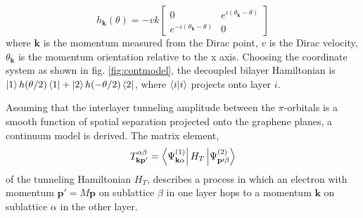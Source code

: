 \begin{equation}
	h_{\mathbf{k}}(\theta)=-vk \begin{bmatrix}
		0 & e^{i(\theta_{\mathbf{k}}-\theta)}\\
		e^{-i(\theta_{\mathbf{k}}-\theta)} & 0 
	\end{bmatrix}
\end{equation}
where $\mathbf{k}$ is the momentum measured from the Dirac point, $v$ is the Dirac velocity, $\theta_{\mathbf{k}}$ is the momentum orientation relative to the x axis. Choosing the coordinate system as shown in fig. \ref{fig:contmodel}, the decoupled bilayer Hamiltonian is $\ket{1} h(\theta/2)\bra{1}+\ket{2}h(-\theta/2)\bra{2}$, where $\bra{i}\ket{i}$ projects onto layer $i$.

Assuming that the interlayer tunneling amplitude between the $\pi$-orbitals is a smooth function of spatial separation projected onto the graphene planes, a continuum model is derived. The matrix element,
\begin{equation}
	T_{\mathbf{kp^\prime}}^{\alpha\beta}=\bra{\Psi_{\mathbf{k}\alpha}^{(1)}}H_T\ket{\Psi_{\mathbf{p\prime}\beta}^{(2)}}
\end{equation}
of the tunneling Hamiltonian $H_T$, describes a process in which an electron with momentum $\mathbf{p\prime}=M\mathbf{p}$ on sublattice $\beta$ in one layer hops to a momentum $\mathbf{k}$ on sublattice $\alpha$ in the other layer.

